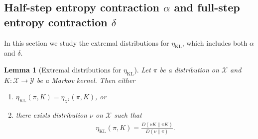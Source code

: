 \documentclass[11pt]{article}
\def\cX{\mathcal{X}}
\def\cY{\mathcal{Y}}
\DeclareMathOperator\KL{\mathrm{KL}}
\newtheorem{lemma}[theorem]{Lemma}
\theoremstyle{definition}
\begin{document}
\subsection{Half-step entropy contraction \texorpdfstring{$\alpha$}{alpha} and full-step entropy contraction \texorpdfstring{$\delta$}{delta}} \label{sec:extremal:alpha-delta}
In this section we study the extremal distributions for $\eta_{\KL}$, which includes both $\alpha$ and $\delta$.
\begin{lemma}[Extremal distributions for $\eta_{\KL}$] \label{lem:extremal-eta-KL}
  Let $\pi$ be a distribution on $\cX$ and $K: \cX \to \cY$ be a Markov kernel. Then either
  \begin{enumerate}[label=(\roman*)]
    \item \label{item:lem-extremal-eta-KL:i} $\eta_{\KL}(\pi, K) = \eta_{\chi^2}(\pi, K)$, or
    \item \label{item:lem-extremal-eta-KL:ii} there exists distribution $\nu$ on $\cX$ such that
    \begin{align}
      \eta_{\KL}(\pi, K) = \frac{D(\nu K \| \pi K)}{D(\nu \| \pi)}.
    \end{align}
  \end{enumerate}
\end{lemma}
\end{document}
